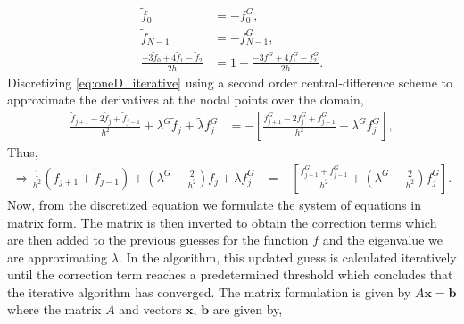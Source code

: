 \documentclass[a4paper, 12pt, twoside, openright]{article}
\numberwithin{equation}{section}
\begin{document}
\begin{align}
\tilde f_0 &= - f^{G}_0,\\
\tilde f_{N-1} &= - f^{G}_{N-1}, \\
\frac{-3\tilde f_0 + 4\tilde f_1 - \tilde f_2}{2h} &= 1 - \frac{-3f^{G}+4f^{G}_1-f^{G}_2}{2h}.
\end{align}
Discretizing \eqref{eq:oneD_iterative} using a second order central-difference scheme to approximate the derivatives at the nodal points over the domain,\\
\begin{align}
\frac{\tilde f_{j+1}-2\tilde f_j + \tilde f_{j-1}}{h^2} + \lambda^{G}\tilde f_j + \tilde \lambda f^{G}_j &= - \left[\frac{f^{G}_{j+1}-2f^{G}_j+f^{G}_{j-1}}{h^2}+ \lambda^{G} f^{G}_j \right] ,
\end{align}
Thus,
\begin{align}
\Rightarrow \frac{1}{h^2}(\tilde f_{j+1} + \tilde f_{j-1}) + (\lambda^{G} - \frac{2}{h^2})\tilde f_j + \tilde \lambda f^{G}_j &= -\left[ \frac{f^G_{j+1} + f^{G}_{j-1}}{h^2} + \left(\lambda^{G}-\frac{2}{h^2}\right)f^{G}_j\right].
\end{align}
Now, from the discretized equation we formulate the system of equations in matrix form. The matrix is then inverted to obtain the correction terms which are then added to the previous guesses for the function $f$ and the eigenvalue we are approximating $\lambda$. In the algorithm, this updated guess is calculated iteratively until the correction term reaches a predetermined threshold which concludes that the iterative algorithm has converged. The matrix formulation is given by $A\mathbf{x}=\mathbf{b}$ where the matrix $A$ and vectors $\mathbf{x}$, $\mathbf{b}$ are given by,
\end{document}

